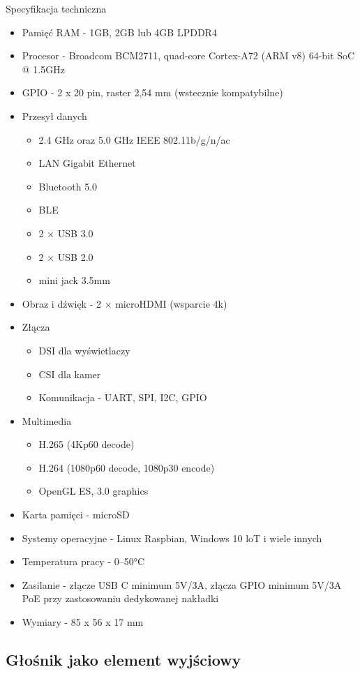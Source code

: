 \documentclass[a4paper,12pt,reqno]{article}
\begin{document}
Specyfikacja techniczna

\begin{itemize}
	\item Pamięć RAM - 1GB, 2GB lub 4GB LPDDR4
	\item Procesor - Broadcom BCM2711, quad-core Cortex-A72 (ARM v8) 64-bit SoC @ 1.5GHz
	\item GPIO - 2 x 20 pin, raster 2,54 mm (wstecznie kompatybilne)
	\item Przesył danych
		\begin{itemize}
			\item 2.4 GHz oraz 5.0 GHz IEEE 802.11b/g/n/ac
			\item LAN Gigabit Ethernet
			\item Bluetooth 5.0
			\item \textcolor{to_check_at_end}{BLE}
			\item 2 × USB 3.0
			\item 2 × USB 2.0
			\item \textcolor{edited}{mini jack 3.5mm}
		\end{itemize}
	\item Obraz i dźwięk - 2 × microHDMI (wsparcie 4k)
	\item Złącza
		\begin{itemize}
			\item DSI dla wyświetlaczy
			\item CSI dla kamer
			\item Komunikacja - UART, SPI, I2C, GPIO
		\end{itemize}
	\item Multimedia
		\begin{itemize}
			\item H.265 (4Kp60 decode)
			\item H.264 (1080p60 decode, 1080p30 encode)
			\item OpenGL ES, 3.0 graphics
		\end{itemize}
	\item Karta pamięci - microSD
	\item Systemy operacyjne - Linux Raspbian, Windows 10 loT i wiele innych
	\item Temperatura pracy - 0–50°C
	\item Zasilanie - złącze USB C minimum 5V/3A, złącza GPIO minimum 5V/3A
PoE przy zastosowaniu dedykowanej nakładki
	\item Wymiary - 85 x 56 x 17 mm
\end{itemize}

\subsection{Głośnik jako element wyjściowy}
\end{document}
